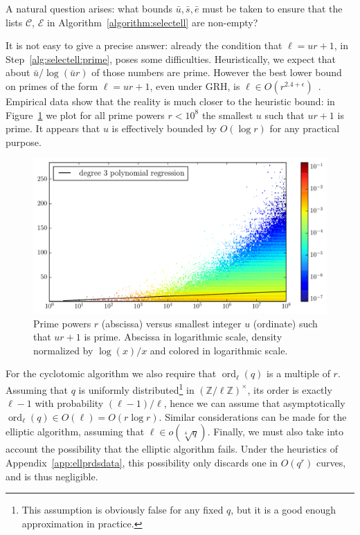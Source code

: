 \documentclass[12pt]{article}
\theoremstyle{plain}
\theoremstyle{definition}
\DeclareMathOperator{\order}{ord} %
\def\Z{\ensuremath{\mathbb{Z}}}
\newcounter{algorithm}
\begin{document}
A natural question arises: what bounds $\bar{u},\bar{s},\bar{e}$ must
be taken to ensure that the lists $\mathcal{C}$, $\mathcal{E}$ in
Algorithm~\ref{algorithm:selectell} are non-empty?

It is not easy to give a precise answer: already the condition that
$\ell=ur+1$, in Step~\ref{alg:selectell:prime}, poses some
difficulties. Heuristically, we expect that about
$\bar{u}/\log(\bar{u}r)$ of those numbers are prime. However the best
lower bound on primes of the form $\ell=ur+1$, even under GRH, is
$\ell\in O(r^{2.4+\epsilon})$~\cite{heath1992zero}. Empirical data
show that the reality is much closer to the heuristic bound: in
Figure~\ref{fig:primes-arith-prog} we plot for all prime powers
$r<10^8$ the smallest $u$ such that $ur+1$ is prime. It appears that
$u$ is effectively bounded by $O(\log r)$ for any practical purpose.


\begin{figure}
  \centering
  \includegraphics[width=\textwidth]{plots/arith_prog}
  \caption{Prime powers $r$ (abscissa) versus smallest integer $u$
    (ordinate) such that $ur+1$ is prime. Abscissa in logarithmic
    scale, density normalized by $\log(x)/x$ and colored in
    logarithmic scale.}
  \label{fig:primes-arith-prog}
\end{figure}

For the cyclotomic algorithm we also require that $\order_\ell(q)$ is
a multiple of $r$. Assuming that $q$ is uniformly
distributed\footnote{This assumption is obviously false for any fixed
  $q$, but it is a good enough approximation in practice.} in
$(\Z/\ell\Z)^\times$, its order is exactly $\ell-1$ with probability
$(\ell-1)/\ell$, hence we can assume that asymptotically
$\order_\ell(q)\in O(\ell)=O(r\log r)$. Similar considerations can be
made for the elliptic algorithm, assuming that $\ell\in
o(\sqrt[4]{q})$.
Finally, we must also take into account the possibility that the
elliptic algorithm fails. Under the heuristics of
Appendix~\ref{app:ellprdsdata}, this possibility only discards one in
$O(q^r)$ curves, and is thus negligible.
\end{document}
